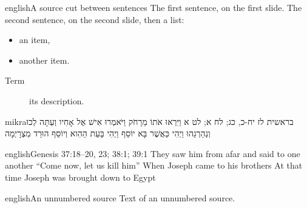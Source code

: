 \begin{mekor}
\begin{mekorlang}{english}{A source cut between sentences}
The first sentence, on the first slide.
\mekorbreak*
The second sentence, on the second slide, then a list:
\begin{itemize}
\item an item,
\item another item.
\end{itemize}
\begin{description}
\item[Term] its description.
\end{description}
\end{mekorlang}
\end{mekor}

\begin{mekor}
\begin{mekorlang}{mikra}{בראשית לז יח-כ, כג; לח א; לט א}
\pasuk[37:18] וַיִּרְאוּ אֹתוֹ מֵרָחֹק
\pasuk וַיֹּאמְרוּ אִישׁ אֶל אָחִיו \dilug
\mekorbreak
\pasuk וְעַתָּה לְכוּ וְנַהַרְגֵהוּ
\dilug \pasuk[23] וַיְהִי כַּאֲשֶׁר \dilug בָּא יוֹסֵף
 וַיְהִי בָּעֵת הַהִוא
\pasuk*[39:1] וְיוֹסֵף הוּרַד מִצְרָיְמָה
\end{mekorlang}
\begin{mekorlang}{english}{Genesis 37:18--20, 23; 38:1; 39:1}
\pasuk[37:18] They saw him from afar
\pasuk and said to one another \dilug
\mekorbreak
\pasuk ``Come now, let us kill him''
\dilug \pasuk[23] When Joseph \dilug came to his brothers
 At that time
\pasuk*[39:1] Joseph was brought down to Egypt
\end{mekorlang}
\end{mekor}


\begin{mekor*}
\begin{mekorlang}{english}{An unnumbered source}
Text of an unnumbered source.
\end{mekorlang}
\end{mekor*}


